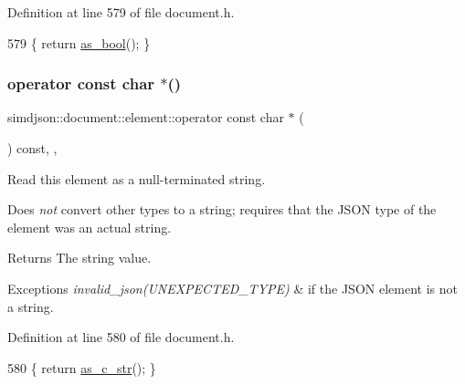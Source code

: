 Definition at line 579 of file document.\+h.


\begin{DoxyCode}
579 \{ \textcolor{keywordflow}{return} \hyperlink{classsimdjson_1_1document_1_1element_a6df6ba7eee788af715ffd494edfa860e}{as\_bool}(); \}
\end{DoxyCode}
\mbox{\label{classsimdjson_1_1document_1_1element_a3c96e921fdff1894188d714446847857}} 
\subsubsection{\texorpdfstring{operator const char $\ast$()}{operator const char *()}}
{\footnotesize\ttfamily simdjson\+::document\+::element\+::operator const char $\ast$ (\begin{DoxyParamCaption}{ }\end{DoxyParamCaption}) const\hspace{0.3cm}{\ttfamily [inline]}, {\ttfamily [explicit]}, {\ttfamily [noexcept]}}



Read this element as a null-\/terminated string. 

Does {\itshape not} convert other types to a string; requires that the J\+S\+ON type of the element was an actual string.

\begin{DoxyReturn}{Returns}
The string value. 
\end{DoxyReturn}

\begin{DoxyExceptions}{Exceptions}
{\em invalid\+\_\+json(\+U\+N\+E\+X\+P\+E\+C\+T\+E\+D\+\_\+\+T\+Y\+P\+E)} & if the J\+S\+ON element is not a string. \\
\hline
\end{DoxyExceptions}


Definition at line 580 of file document.\+h.


\begin{DoxyCode}
580 \{ \textcolor{keywordflow}{return} \hyperlink{classsimdjson_1_1document_1_1element_ae3df9bdbad4492c1c19b11c66c5e61be}{as\_c\_str}(); \}
\end{DoxyCode}
\mbox{\label{classsimdjson_1_1document_1_1element_ac217a7d104132a849a4c63820af91da8}} 
